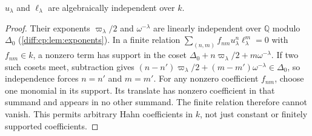 \documentclass[11pt,letterpaper]{article}
\numberwithin{equation}{section}
\theoremstyle{definition}
\theoremstyle{remark}
\newcommand{\Q}{\mathbb Q}
\begin{document}
\begin{lemma}
\label{diff:cp:lem:algind}
$u_{\lambda}$ and $\ell_{\lambda}$ are algebraically independent over $k$.
\end{lemma}
\begin{proof}
Their exponents $\varpi_{\lambda}/2$ and $\omega^{-\lambda}$ are linearly
independent over $\Q$ modulo $\Delta_{0}$ (\cref{diff:cp:lem:exponents}). In a
finite relation $\sum_{(n,m)}f_{nm}u_{\lambda}^{n}\ell_{\lambda}^{m}=0$ with
$f_{nm}\in k$, a nonzero term has support in the coset
$\Delta_{0}+n\varpi_{\lambda}/2+m\omega^{-\lambda}$.
If two such cosets meet, subtraction gives
$(n-n')\varpi_{\lambda}/2+(m-m')\omega^{-\lambda}\in\Delta_0$,
so independence forces $n=n'$ and $m=m'$. For any nonzero
coefficient $f_{nm}$, choose one monomial in its support. Its
translate has nonzero coefficient in that summand and appears
in no other summand. The finite relation therefore cannot vanish.
This permits arbitrary Hahn coefficients in $k$, not just
constant or finitely supported coefficients.
\end{proof}
\end{document}
